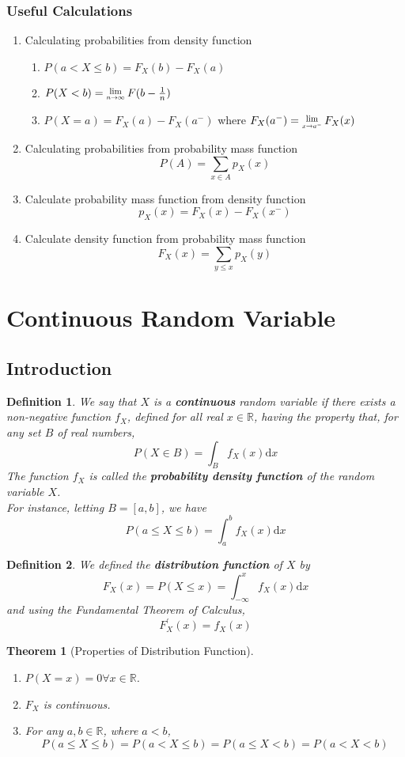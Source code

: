 \documentclass[12pt]{article}
\newcommand{\diff}{\mathrm{d}}
\newcommand{\Lim}[1]{\raisebox{0.5ex}{\scalebox{0.8}{$\displaystyle \lim_{#1}\;$}}}
\newtheorem{definition}{Definition}[section]
\newtheorem{theorem}{Theorem}[section]
\theoremstyle{definition}
\begin{document}
\subsubsection{Useful Calculations}
\begin{enumerate}
\item Calculating probabilities from density function
\begin{enumerate}
\item $P(a<X\leq b)=F_X(b)-F_X(a)$
\item $P(X<b)=\Lim{n\to\infty}F(b-\frac{1}{n})$
\item $P(X=a)=F_X(a)-F_X(a^-)$ where $F_X(a^-)=\Lim{x\to a^-}F_X(x)$
\end{enumerate}
\item Calculating probabilities from probability mass function
\[
P(A)=\sum_{x\in A}p_X(x)
\]
\item Calculate probability mass function from density function
\[
p_X(x)=F_X(x)-F_X(x^-)
\]
\item Calculate density function from probability mass function
\[
F_X(x)=\sum_{y\leq x}p_X(y)
\]
\end{enumerate}
\clearpage
\section{Continuous Random Variable}
\subsection{Introduction}
\begin{definition}\normalfont We say that $X$ is a \textbf{continuous} random variable if there exists a non-negative function $f_X$, defined for all real $x\in\mathbb{R}$, having the property that, for any set $B$ of real numbers,
\[
P(X\in B)=\int_B f_X(x)\diff x
\]
The function $f_X$ is called the \textbf{probability density function} of the random variable $X$.\\
For instance, letting $B = [a,b]$, we have
\[
P(a\leq X\leq b) = \int_a^b f_X(x)\diff x
\]
\end{definition}
\begin{definition}\normalfont We defined the \textbf{distribution function} of $X$ by
\[
F_X(x)=P(X\leq x) = \int_{-\infty}^x f_X(x)\diff x
\]
and using the Fundamental Theorem of Calculus,
\[
F_X^\prime (x)=f_X(x)
\]
\end{definition}
\begin{theorem}[Properties of Distribution Function]
\begin{enumerate}
\item $P(X=x)=0\forall x\in\mathbb{R}$.
\item $F_X$ is continuous.
\item For any $a,b\in\mathbb{R}$, where $a<b$,
\[
P(a\leq X\leq b) = P(a<X\leq b)=P(a\leq X<b)=P(a<X<b)
\]
\end{enumerate}
\end{theorem}
\end{document}
